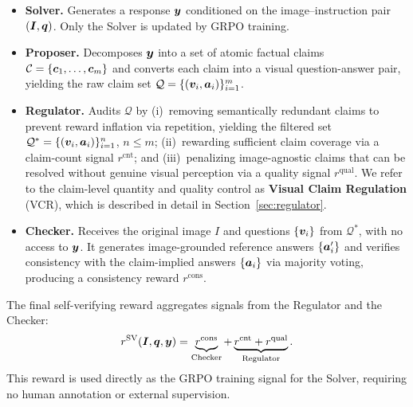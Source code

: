 \begin{itemize}[leftmargin=1em,itemsep=2pt]
\item \textbf{Solver.} Generates a response ${\bm{y}}$ conditioned on the
    image--instruction pair $({\bm{I}}, {\bm{q}})$.
    Only the Solver is updated by GRPO training.
\item \textbf{Proposer.} Decomposes ${\bm{y}}$ into a set of
    atomic factual claims $\mathcal{C} = \{{\bm{c}}_1, \ldots, {\bm{c}}_m\}$ and
    converts each claim into a visual question-answer pair, yielding the
    raw claim set $\mathcal{Q} = \{({\bm{v}}_i, {\bm{a}}_i)\}_{i=1}^{m}$.
\item \textbf{Regulator.} Audits $\mathcal{Q}$ by
    (i)~removing semantically redundant claims to prevent reward inflation
    via repetition, yielding the filtered set
    $\mathcal{Q}^{\ast} = \{({\bm{v}}_i, {\bm{a}}_i)\}_{i=1}^{n}$, $n \leq m$;
    (ii)~rewarding sufficient claim coverage via a claim-count signal
    $r^{\text{cnt}}$; and (iii)~penalizing image-agnostic claims that
    can be resolved without genuine visual perception via a quality signal
    $r^{\text{qual}}$. 
    We refer to the claim-level quantity and quality control as \textbf{Visual Claim Regulation} (VCR), which is described in detail in Section~\ref{sec:regulator}.
\item \textbf{Checker.} Receives the original image $I$ and questions $\{{\bm{v}}_i\}$ from $\mathcal{Q}^{\ast}$, with no access to ${\bm{y}}$.
    It generates image-grounded reference answers $\{{\bm{a}}_i'\}$ and verifies
    consistency with the claim-implied answers $\{{\bm{a}}_i\}$ via majority
    voting, producing a consistency reward $r^{\text{cons}}$.
\end{itemize}

The final self-verifying reward aggregates signals from the Regulator and
the Checker:
\begin{equation}
    r^{\text{SV}}({\bm{I}}, {\bm{q}}, {\bm{y}})
    = \underbrace{r^{\text{cons}}}_{\text{Checker}}
    + \underbrace{r^{\text{cnt}} + r^{\text{qual}}}_{\text{Regulator}}.
    \label{eq:reward_total}
\end{equation}
This reward is used directly as the GRPO training signal for the Solver,
requiring no human annotation or external supervision.




